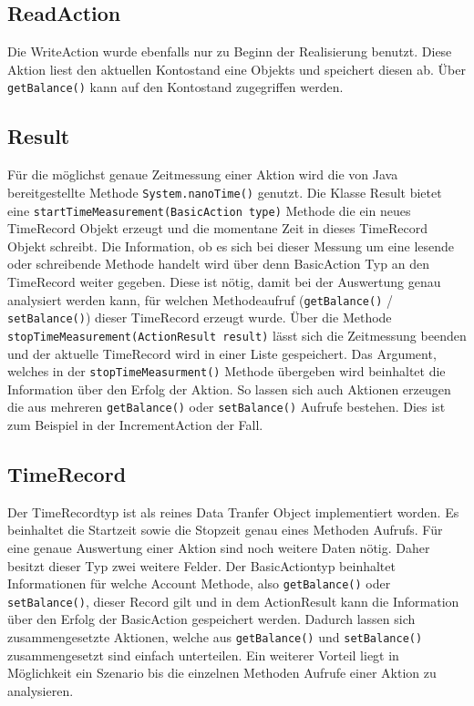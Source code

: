 \subsection{ReadAction}
\label{sec:readAction}
Die WriteAction wurde ebenfalls nur zu Beginn der Realisierung benutzt. Diese Aktion liest den aktuellen Kontostand eine Objekts und speichert diesen ab. Über \verb+getBalance()+ kann auf den Kontostand zugegriffen werden.

\subsection{Result}
\label{sec:result}
Für die möglichst genaue Zeitmessung einer Aktion wird die von Java bereitgestellte Methode \verb+System.nanoTime()+ genutzt. Die Klasse Result bietet eine \verb+startTimeMeasurement(BasicAction type)+ Methode die ein neues TimeRecord Objekt erzeugt und die momentane Zeit in dieses TimeRecord Objekt schreibt. Die Information, ob es sich bei dieser Messung um eine lesende oder schreibende Methode handelt wird über denn BasicAction Typ an den TimeRecord weiter gegeben. Diese ist nötig, damit bei der Auswertung genau analysiert werden kann, für welchen Methodeaufruf (\verb+getBalance()+ / \verb+setBalance()+) dieser TimeRecord erzeugt wurde. Über die Methode \verb+stopTimeMeasurement(ActionResult result)+ lässt sich die Zeitmessung beenden und der aktuelle TimeRecord wird in einer Liste gespeichert. Das Argument, welches in der \verb+stopTimeMeasurment()+ Methode übergeben wird beinhaltet die Information über den Erfolg der Aktion. So lassen sich auch Aktionen erzeugen die aus mehreren \verb+getBalance()+ oder \verb+setBalance()+ Aufrufe bestehen. Dies ist zum Beispiel in der IncrementAction der Fall.

\subsection{TimeRecord}
\label{sec:timeRecord}
Der TimeRecordtyp ist als reines Data Tranfer Object implementiert worden. Es beinhaltet die Startzeit sowie die Stopzeit genau eines Methoden Aufrufs. Für eine genaue Auswertung einer Aktion sind noch weitere Daten nötig. Daher besitzt dieser Typ zwei weitere Felder. Der BasicActiontyp beinhaltet Informationen für welche Account Methode, also \verb+getBalance()+ oder \verb+setBalance()+, dieser Record gilt und in dem ActionResult kann die Information über den Erfolg der BasicAction gespeichert werden. Dadurch lassen sich zusammengesetzte Aktionen, welche aus \verb+getBalance()+ und \verb+setBalance()+ zusammengesetzt sind einfach unterteilen. Ein weiterer Vorteil liegt in Mög\-lich\-keit ein Sze\-na\-rio bis die ein\-zel\-nen Me\-tho\-den Auf\-rufe einer Aktion zu analysieren. 

